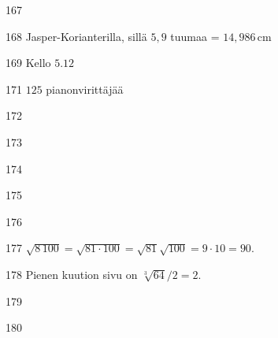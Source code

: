 \begin{Vastaus}{167}
	
\end{Vastaus}
\begin{Vastaus}{168}
Jasper-Korianterilla, sillä $5,9$ tuumaa = $14,986$\,cm
	
\end{Vastaus}
\begin{Vastaus}{169}
Kello $5.12$
	
\end{Vastaus}
\begin{Vastaus}{171}
$125$ pianonvirittäjää
	
\end{Vastaus}
\begin{Vastaus}{172}
	
\end{Vastaus}
\begin{Vastaus}{173}
	
\end{Vastaus}
\begin{Vastaus}{174}
	
\end{Vastaus}
\begin{Vastaus}{175}
	
\end{Vastaus}
\begin{Vastaus}{176}
	
\end{Vastaus}
\begin{Vastaus}{177}
$\sqrt{8\,100}=\sqrt{81\cdot100}=\sqrt{81}\sqrt{100}=9\cdot 10=90$.
	
\end{Vastaus}
\begin{Vastaus}{178}
Pienen kuution sivu on $\sqrt[3]{64}/2=2$.
	
\end{Vastaus}
\begin{Vastaus}{179}
	
\end{Vastaus}
\begin{Vastaus}{180}
	
\end{Vastaus}

